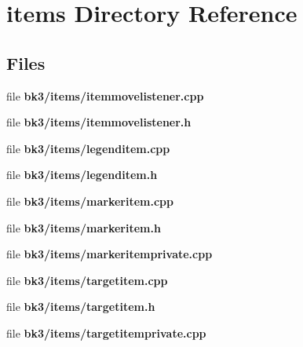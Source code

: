 \section{items Directory Reference}
\label{dir_3c447c2f3c28c516cfaff1b7df58290e}
\subsection*{Files}
\begin{DoxyCompactItemize}
\item 
file {\bf bk3/items/itemmovelistener.\+cpp}
\item 
file {\bf bk3/items/itemmovelistener.\+h}
\item 
file {\bf bk3/items/legenditem.\+cpp}
\item 
file {\bf bk3/items/legenditem.\+h}
\item 
file {\bf bk3/items/markeritem.\+cpp}
\item 
file {\bf bk3/items/markeritem.\+h}
\item 
file {\bf bk3/items/markeritemprivate.\+cpp}
\item 
file {\bf bk3/items/targetitem.\+cpp}
\item 
file {\bf bk3/items/targetitem.\+h}
\item 
file {\bf bk3/items/targetitemprivate.\+cpp}
\end{DoxyCompactItemize}
